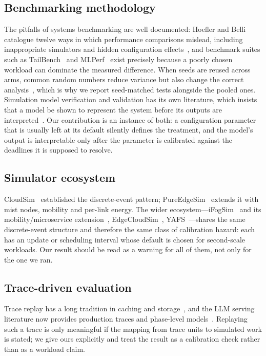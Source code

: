 \documentclass[journal,10pt]{IEEEtran}
\begin{document}
\subsection{Benchmarking methodology}
The pitfalls of systems benchmarking are well documented: Hoefler and Belli
catalogue twelve ways in which performance comparisons mislead, including
inappropriate simulators and hidden configuration
effects~\cite{hoefler2015benchmarking}, and benchmark suites such as
TailBench~\cite{kasture2016tailbench} and MLPerf~\cite{reddi2020mlperf} exist
precisely because a poorly chosen workload can dominate the measured difference.
When seeds are reused across arms, common random numbers reduce variance but
also change the correct analysis~\cite{glasserman1992common}, which is why we
report seed-matched tests alongside the pooled ones. Simulation model verification and
validation has its own literature, which insists that a model be shown to
represent the system before its outputs are interpreted~\cite{sargent2013verification}.
Our contribution is an instance of both: a configuration parameter that is
usually left at its default silently defines the treatment, and the model's
output is interpretable only after the parameter is calibrated against the
deadlines it is supposed to resolve.

\subsection{Simulator ecosystem}
CloudSim~\cite{calheiros2011cloudsim} established the discrete-event pattern;
PureEdgeSim~\cite{mechalikh2021pureedgesim} extends it with mist nodes, mobility
and per-link energy. The wider ecosystem---iFogSim~\cite{gupta2017ifogsim} and its mobility/microservice
extension~\cite{mahmud2022ifogsim2},
EdgeCloudSim~\cite{sonmez2018edgecloudsim},
YAFS~\cite{lera2019yafs}---shares the same discrete-event structure and
therefore the same class of calibration hazard: each has an update or scheduling
interval whose default is chosen for second-scale workloads. Our result should
be read as a warning for all of them, not only for the one we ran.

\subsection{Trace-driven evaluation}
Trace replay has a long tradition in caching and
storage~\cite{breslau1999caching}, and the LLM serving
literature now provides production traces and phase-level
models~\cite{patel2024splitwise,shahrad2020serverless}. Replaying such a trace
is only meaningful if the mapping from trace units to simulated work is stated;
we give ours explicitly and treat the result as a calibration check rather than
as a workload claim.
\end{document}

